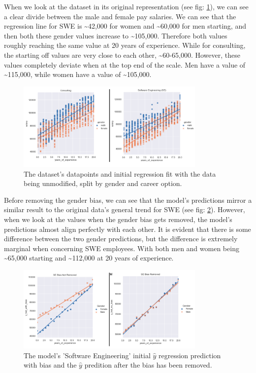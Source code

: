 \documentclass{sigchi}
\begin{document}
	When we look at the dataset in its original representation (see fig: \ref{fig:original_data}), we can see a clear divide between the male and female pay salaries. We can see that the regression line for SWE is \textasciitilde{42,000} for women and \textasciitilde{60,000} for men starting, and then both these gender values increase to \textasciitilde{105,000}. Therefore both values roughly reaching the same value at 20 years of experience. While for consulting, the starting off values are very close to each other, \textasciitilde{60-65,000}. However, these values completely deviate when at the top end of the scale. Men have a value of \textasciitilde{115,000}, while women have a value of \textasciitilde{105,000}.

	\begin{figure}[h]
		\includegraphics[width=9.2cm]{original_data.png}
		\caption{The dataset's datapoints and initial regression fit with the data being unmodified, split by gender and career option.}
		\label{fig:original_data}
		\centering
	\end{figure}

	Before removing the gender bias, we can see that the model's predictions mirror a similar result to the original data's general trend for SWE (see fig: \ref{fig:se_comparison}).  However, when we look at the values when the gender bias gets removed, the model's predictions almost align perfectly with each other. It is evident that there is some difference between the two gender predictions, but the difference is extremely marginal when concerning SWE employees. With both men and women being \textasciitilde{65,000} starting and \textasciitilde{112,000} at 20 years of experience.
	
	\begin{figure}[h]
		\includegraphics[width=9.2cm]{se_comparison.png}
		\caption{The model's 'Software Engineering' initial $\hat{y}$ regression prediction with bias and the $\hat{y}$ predition after the bias has been removed.}
		\label{fig:se_comparison}
		\centering
	\end{figure}
\end{document}

